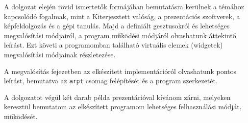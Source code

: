 A dolgozat elején rövid ismertetők formájában bemutatásra kerülnek a témához kapcsolódó fogalmak, mint a Kiterjesztett valóság, a prezentációs szoftverek, a képfeldolgozás és a gépi tanulás. Majd a definiált gesztusokról és lehetséges megvalósítási módjairól, a program működési módjáról olvashatunk áttekintő leírást. Ezt követi a programomban található virtuális elemek (widgetek) megvalósítási módjainak részletezése.

A megvalósítás fejezetben az elkészített implementációról olvashatunk pontos leírást, bemutatva az \texttt{arpt} csomag felépítését és a program szerkezetét.

A dolgozatot végül két darab példa prezentációval kívánom zárni, melyeken keresztül bemutatom az elkészített programom lehetséges felhasználási módját, működését.
